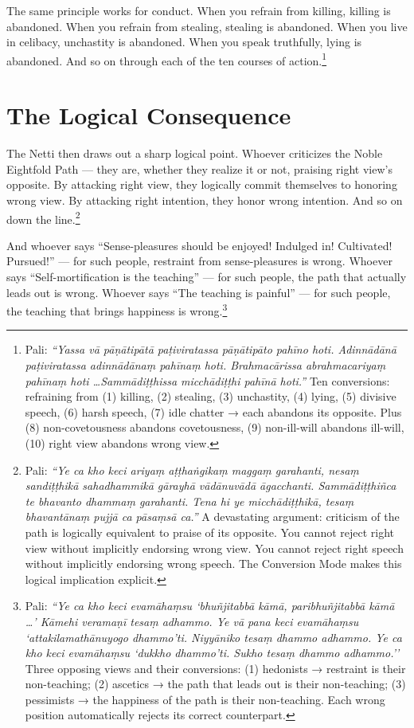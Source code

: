 The same principle works for conduct. When you refrain from killing, killing is abandoned. When you refrain from stealing, stealing is abandoned. When you live in celibacy, unchastity is abandoned. When you speak truthfully, lying is abandoned. And so on through each of the ten courses of action.\footnote{Pali: \textit{``Yassa vā pāṇātipātā paṭiviratassa pāṇātipāto pahīno hoti. Adinnādānā paṭiviratassa adinnādānaṃ pahīnaṃ hoti. Brahmacārissa abrahmacariyaṃ pahīnaṃ hoti \ldots Sammādiṭṭhissa micchādiṭṭhi pahīnā hoti.''} Ten conversions: refraining from (1) killing, (2) stealing, (3) unchastity, (4) lying, (5) divisive speech, (6) harsh speech, (7) idle chatter → each abandons its opposite. Plus (8) non-covetousness abandons covetousness, (9) non-ill-will abandons ill-will, (10) right view abandons wrong view.}

\section*{The Logical Consequence}

The Netti then draws out a sharp logical point. Whoever criticizes the Noble Eightfold Path --- they are, whether they realize it or not, praising right view's opposite. By attacking right view, they logically commit themselves to honoring wrong view. By attacking right intention, they honor wrong intention. And so on down the line.\footnote{Pali: \textit{``Ye ca kho keci ariyaṃ aṭṭhaṅgikaṃ maggaṃ garahanti, nesaṃ sandiṭṭhikā sahadhammikā gārayhā vādānuvādā āgacchanti. Sammādiṭṭhiñca te bhavanto dhammaṃ garahanti. Tena hi ye micchādiṭṭhikā, tesaṃ bhavantānaṃ pujjā ca pāsaṃsā ca.''} A devastating argument: criticism of the path is logically equivalent to praise of its opposite. You cannot reject right view without implicitly endorsing wrong view. You cannot reject right speech without implicitly endorsing wrong speech. The Conversion Mode makes this logical implication explicit.}

And whoever says ``Sense-pleasures should be enjoyed! Indulged in! Cultivated! Pursued!'' --- for such people, restraint from sense-pleasures is wrong. Whoever says ``Self-mortification is the teaching'' --- for such people, the path that actually leads out is wrong. Whoever says ``The teaching is painful'' --- for such people, the teaching that brings happiness is wrong.\footnote{Pali: \textit{``Ye ca kho keci evamāhaṃsu `bhuñjitabbā kāmā, paribhuñjitabbā kāmā \ldots' Kāmehi veramaṇī tesaṃ adhammo. Ye vā pana keci evamāhaṃsu `attakilamathānuyogo dhammo'ti. Niyyāniko tesaṃ dhammo adhammo. Ye ca kho keci evamāhaṃsu `dukkho dhammo'ti. Sukho tesaṃ dhammo adhammo.''} Three opposing views and their conversions: (1) hedonists → restraint is their non-teaching; (2) ascetics → the path that leads out is their non-teaching; (3) pessimists → the happiness of the path is their non-teaching. Each wrong position automatically rejects its correct counterpart.}

